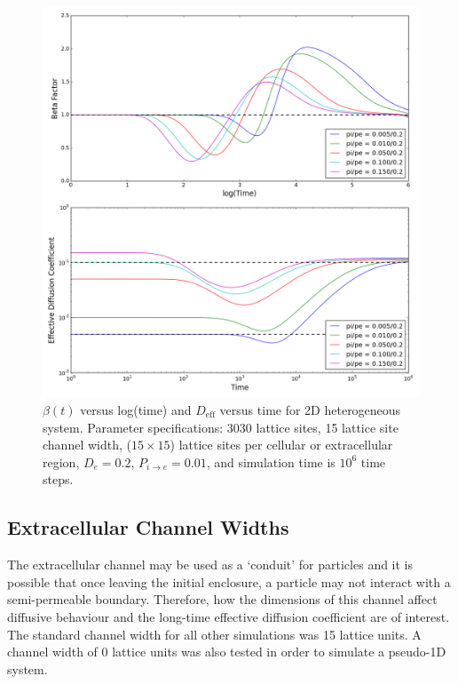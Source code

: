 	\begin{figure}[h!]
		\centering
		\includegraphics[width=1.0\linewidth]{../images/2D/pipe_beta_deff_2D}
		\caption{$ \beta (t) $ versus log(time) and $ D_\textrm{eff} $ versus time for 2D heterogeneous system. Parameter specifications: 3030 lattice sites, 15 lattice site channel width, ($ 15 \times 15 $) lattice sites per cellular or extracellular region, $ D_e = 0.2 $, $ P_{i \rightarrow e} = 0.01 $, and simulation time is $ 10^6 $ time steps.}
		\label{fig:pipe_beta_deff_2D}
	\end{figure}
	
\clearpage
\subsection{Extracellular Channel Widths}
\label{sec:2D-channel-width}
	
	The extracellular channel may be used as a `conduit' for particles and it is possible that once leaving the initial enclosure, a particle may not interact with a semi-permeable boundary. Therefore, how the dimensions of this channel affect diffusive behaviour and the long-time effective diffusion coefficient are of interest. The standard channel width for all other simulations was 15 lattice units. A channel width of 0 lattice units was also tested in order to simulate a pseudo-1D system. 
	
